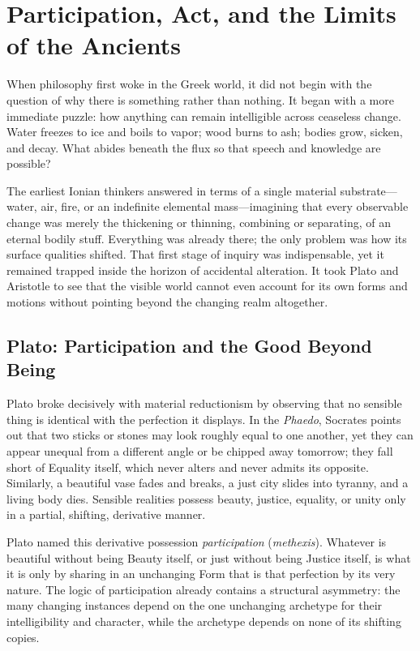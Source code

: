 \section{Participation, Act, and the Limits of the Ancients}

When philosophy first woke in the Greek world, it did not begin with the question of why there is something rather than nothing. It began with a more immediate puzzle: how anything can remain intelligible across ceaseless change. Water freezes to ice and boils to vapor; wood burns to ash; bodies grow, sicken, and decay. What abides beneath the flux so that speech and knowledge are possible?

The earliest Ionian thinkers answered in terms of a single material substrate---water, air, fire, or an indefinite elemental mass---imagining that every observable change was merely the thickening or thinning, combining or separating, of an eternal bodily stuff. Everything was already there; the only problem was how its surface qualities shifted. That first stage of inquiry was indispensable, yet it remained trapped inside the horizon of accidental alteration. It took Plato and Aristotle to see that the visible world cannot even account for its own forms and motions without pointing beyond the changing realm altogether.

\subsection{Plato: Participation and the Good Beyond Being}

Plato broke decisively with material reductionism by observing that no sensible thing is identical with the perfection it displays. In the \emph{Phaedo}, Socrates points out that two sticks or stones may look roughly equal to one another, yet they can appear unequal from a different angle or be chipped away tomorrow; they fall short of Equality itself, which never alters and never admits its opposite. Similarly, a beautiful vase fades and breaks, a just city slides into tyranny, and a living body dies. Sensible realities possess beauty, justice, equality, or unity only in a partial, shifting, derivative manner.

Plato named this derivative possession \emph{participation} (\emph{methexis}). Whatever is beautiful without being Beauty itself, or just without being Justice itself, is what it is only by sharing in an unchanging Form that is that perfection by its very nature. The logic of participation already contains a structural asymmetry: the many changing instances depend on the one unchanging archetype for their intelligibility and character, while the archetype depends on none of its shifting copies.

